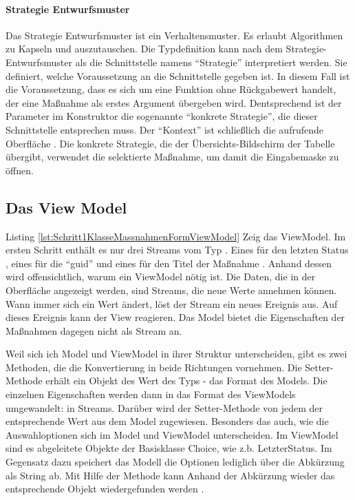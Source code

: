 \paragraph{Strategie Entwurfsmuster} Das Strategie Entwurfsmuster ist ein Verhaltensmuster. Es erlaubt Algorithmen zu Kapseln und auszutauschen. Die Typdefinition   kann nach dem Strategie-Entwurfsmuster als die Schnittstelle namens \enquote{Strategie} interpretiert werden. Sie definiert, welche Voraussetzung an die Schnittstelle gegeben ist. In diesem Fall ist die Voraussetzung, dass es sich um eine Funktion ohne Rückgabewert handelt, der eine Maßnahme als erstes Argument übergeben wird. Dentsprechend ist der Parameter  im Konstruktor die sogenannte \enquote{konkrete Strategie}, die dieser Schnittstelle entsprechen muss. Der \enquote{Kontext} ist schließlich die aufrufende Oberfläche . Die konkrete Strategie, die der Übersichts-Bildschirm der Tabelle übergibt, verwendet die selektierte Maßnahme, um damit die Eingabemaske zu öffnen. 

\clearpage


\subsection{ Das View Model }

Listing \ref{lst:Schritt1KlasseMassnahmenFormViewModel} Zeig das ViewModel. Im ersten Schritt enthält es nur drei Streams vom Typ . Eines für den letzten Status , eines für die \enquote{guid}  und eines für den Titel der Maßnahme . Anhand dessen wird offensichtlich, warum ein ViewModel nötig ist. Die Daten, die in der Oberfläche angezeigt werden, sind Streams, die neue Werte annehmen können. Wann immer sich ein Wert ändert, löst der Stream ein neues Ereignis aus. Auf dieses Ereignis kann der View reagieren. Das Model bietet die Eigenschaften der Maßnahmen dagegen nicht als Stream an. 

Weil sich ich Model und ViewModel in ihrer Struktur unterscheiden, gibt es zwei Methoden, die die Konvertierung in beide Richtungen vornehmen. Die Setter-Methode   erhält ein Objekt des Wert des Typs  - das Format des Models. Die einzelnen Eigenschaften werden dann in das Format des ViewModels umgewandelt: in Streams. Darüber wird der Setter-Methode  von jedem  der entsprechende Wert aus dem Model zugewiesen. Besonders das auch, wie die Auswahloptionen sich im Model und ViewModel unterscheiden.  Im ViewModel sind es abgeleitete Objekte der Basisklasse Choice, wie z.b. LetzterStatus.  Im Gegensatz dazu speichert das Modell die Optionen lediglich über die Abkürzung als String ab. Mit Hilfe der Methode  kann Anhand der Abkürzung wieder das entsprechende Objekt wiedergefunden werden . 

